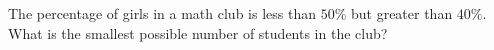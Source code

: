 The percentage of girls in a math club is less than $50\%$ but greater than $40\%$. What is the smallest possible number of students in the club?
